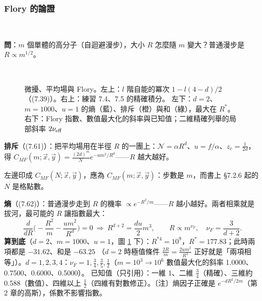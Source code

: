\subsubsection{Flory 的論證}
\leavevmode{}\ \par\nopagebreak

\textbf{問}：$m$ 個單體的高分子（自迴避漫步），大小 $R$ 怎麼隨 $m$ 變大？普通漫步是 $R\propto m^{1/2}$。

\begin{figure}[htbp]
\centering
\begin{minipage}[c]{0.3\linewidth}\centering\small\setlength{\tabcolsep}{4pt}\SevenTabPower\end{minipage}\hfill
\begin{minipage}[c]{0.68\linewidth}\centering\footnotesize\setlength{\tabcolsep}{3.5pt}\SevenTabMF\end{minipage}\\[8pt]
\begin{minipage}[c]{0.42\linewidth}\centering\SevenFigFlory\end{minipage}\hfill
\begin{minipage}[c]{0.56\linewidth}\centering\footnotesize\setlength{\tabcolsep}{4pt}\SevenTabFlory\end{minipage}
\caption{微擾、平均場與 Flory。左上：$l$ 階自能的冪次 $1-l(4-d)/2$（(7.39)）。右上：練習 7.4、7.5 的精確積分。
左下：$d=2$、$m=1000$、$u=1$ 的熵（藍）、排斥（橙）與和（綠），最大在 $R^*$。右下：Flory 指數、數值最大化的斜率與已知值；二維精確列舉的局部斜率 $2\nu_{\rm eff}$}\label{seven-fig-mf}
\end{figure}

\textbf{排斥}（(7.61)）：把平均場用在半徑 $R$ 的一團上：$\mathcal N=\alpha R^d$、$u=f/\alpha$、$z_c=\frac1{2d}$，得
$C_{MF}(m;\vec x,\vec y)=\frac{(2d)^m}{\mathcal N}e^{-um^2/R^d}$——$R$ 越大越好。
\begin{errbox}[p.~191，(7.61)]
左邊印成 $C_{MF}(N;\vec x,\vec y)$，應為 $C_{MF}(m;\vec x,\vec y)$：步數是 $m$，而書上 §7.2.6 起的 $N$ 是格點數。
\end{errbox}
\textbf{熵}（(7.62)）：普通漫步走到 $R$ 的機率 $\propto e^{-R^2/m}$——$R$ 越小越好。兩者相乘就是拔河，最可能的 $R$ 讓指數最大：
\[\frac{d}{dR}\Big(-\frac{R^2}m-\frac{um^2}{R^d}\Big)=0\ \Rightarrow\ R^{d+2}=\frac{du}{2}m^3,\qquad R\propto m^{\nu_F},\quad\nu_F=\frac3{d+2}.\tag{7.63, 7.64}\]
\textbf{算到底}（$d=2$、$m=1000$、$u=1$，圖 \ref{seven-fig-mf} 下）：$R^{*4}=10^9$，$R^*=177.83$；此時兩項都是 $-31.62$、和是 $-63.25$
（$d=2$ 時極值條件 $\frac{2R}m=\frac{2um^2}{R^3}$ 正好就是「兩項相等」）。$d=1,2,3,4$：$\nu_F=1,\frac34,\frac35,\frac12$（$m=10^3\to10^6$ 數值最大化的斜率 1.0000、0.7500、0.6000、0.5000）。
已知值（只引用）：一維 1、二維 $\frac34$（精確）、三維約 0.588（數值）、四維以上 $\frac12$（四維有對數修正）。〔注〕熵因子正確是 $e^{-dR^2/2m}$（第 2 章的高斯），係數不影響指數。

